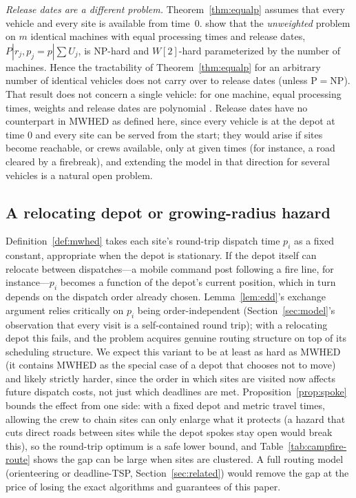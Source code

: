 \documentclass[pdflatex,sn-mathphys-ay]{sn-jnl}
\theoremstyle{thmstyleone}
\theoremstyle{thmstyletwo}
\theoremstyle{thmstylethree}
\begin{document}
\emph{Release dates are a different problem.} Theorem~\ref{thm:equalp}
assumes that every vehicle and every site is available from time~$0$.
\citet{heegermolter2025} show that the \emph{unweighted} problem on $m$
identical machines with equal processing times and release dates,
$P|r_j,p_j{=}p|\sum U_j$, is NP-hard and $W[2]$-hard parameterized by the
number of machines. Hence the tractability of
Theorem~\ref{thm:equalp} for an arbitrary number of identical vehicles
does not carry over to release dates (unless $\mathrm P=\mathrm{NP}$). That result does not
concern a single vehicle: for one machine, equal processing times,
weights and release dates are polynomial \citep{baptiste1999}. Release
dates have no counterpart in MWHED as defined here, since every vehicle
is at the depot at time $0$ and every site can be served from the start;
they would arise if sites become reachable, or crews available, only at
given times (for instance, a road cleared by a firebreak), and extending
the model in that direction for several vehicles is a natural open
problem.

\subsection{A relocating depot or growing-radius hazard}\label{sec:disc-relocate}

Definition~\ref{def:mwhed} takes each site's round-trip dispatch time
$p_i$ as a fixed constant, appropriate when the depot is stationary. If
the depot itself can relocate between dispatches---a mobile command
post following a fire line, for instance---$p_i$ becomes a function of
the depot's current position, which in turn depends on the dispatch
order already chosen. Lemma~\ref{lem:edd}'s exchange argument relies
critically on $p_i$ being order-independent (Section~\ref{sec:model}'s
observation that every visit is a self-contained round trip); with a
relocating depot this fails, and the problem acquires genuine routing
structure on top of its scheduling structure. We expect this variant to
be at least as hard as MWHED (it contains MWHED as the special case of
a depot that chooses not to move) and likely strictly harder, since the
order in which sites are visited now affects future dispatch costs, not
just which deadlines are met. Proposition~\ref{prop:spoke} bounds the
effect from one side: with a fixed depot and metric travel times,
allowing the crew to chain sites can only enlarge what it protects (a
hazard that cuts direct roads between sites while the depot spokes stay
open would break this), so the round-trip optimum is a safe
lower bound, and Table~\ref{tab:campfire-route} shows the gap can be large
when sites are clustered. A full routing model (orienteering or
deadline-TSP, Section~\ref{sec:related}) would remove the gap at the price
of losing the exact algorithms and guarantees of this paper.
\end{document}
